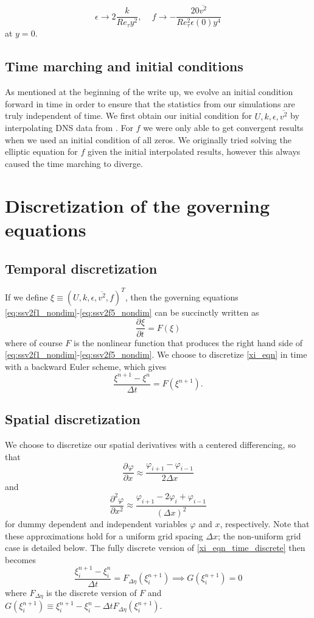 \documentclass[a4paper,11pt]{article}
\newcommand{\pderiv}[3][]{%
  \ensuremath{\frac{\partial^{#1} {#2}}{\partial {#3}^{#1}}}}
\newcommand{\ep}{\epsilon}
\begin{document}
\[
\epsilon \to 2\frac{k}{Re_{\tau}y^2}, \,\,\,\,\,\,\, f \to -\frac{20
\overline{v^2} }{Re_\tau^2 \ep(0) y^4}
\]
at $y = 0$.  

\subsection{Time marching and initial conditions}
As mentioned at the beginning of the write up, we evolve an initial condition
forward in time in order to ensure that the statistics from our simulations are
truly independent of time. We first obtain our initial condition for $U, k, \ep,
\overline{v^2}$ by interpolating DNS data from \cite{Lee}. For $f$ we were only
able to get convergent results when we used an initial condition of all zeros.
We originally tried solving the elliptic equation for $f$ given the initial
interpolated results, however this always caused the time marching to diverge.

\section{Discretization of the governing equations}
\subsection{Temporal discretization}
If we define $\xi \equiv (U, k, \ep, \overline{v^2}, f)^T$, then the governing equations \eqref{eq:ssv2f1_nondim}-\eqref{eq:ssv2f5_nondim} can be succinctly written as 
\begin{equation}\label{xi_eqn}
\pderiv{\xi}{t} = F(\xi)
\end{equation}
where of course $F$ is the nonlinear function that produces the right hand side of \eqref{eq:ssv2f1_nondim}-\eqref{eq:ssv2f5_nondim}. We choose to discretize \eqref{xi_eqn} in time with a backward Euler scheme, which gives
\begin{equation}\label{xi_eqn_time_discrete}
\frac{\xi^{n+1} - \xi^n}{\Delta t} = F(\xi^{n+1}).
\end{equation}

\subsection{Spatial discretization}
We choose to discretize our spatial derivatives with a centered differencing, so that 
\[
\pderiv{\varphi}{x} \approx \frac{\varphi_{i+1}-\varphi_{i-1}}{2\Delta x} 
\]
and 
\[
\frac{\partial^2 \varphi}{\partial x^2} \approx \frac{ \varphi_{i+1} - 2\varphi_i + \varphi_{i-1} }{(\Delta x)^2} 
\]
for dummy dependent and independent variables $\varphi$ and $x$, respectively. Note that these approximations hold for a uniform grid spacing $\Delta x$; the non-uniform grid case is detailed below. The fully discrete version of \eqref{xi_eqn_time_discrete} then becomes 
\begin{equation}\label{xi_eqn_fully_discrete}
\frac{\xi_i^{n+1} - \xi_i^n}{\Delta t} = F_{\Delta \eta}(\xi_i^{n+1}) \implies G(\xi^{n+1}_i) = 0 
\end{equation}
where $F_{\Delta \eta}$ is the discrete version of $F$ and $G(\xi_i^{n+1}) \equiv \xi^{n+1}_i - \xi^n_i - \Delta t F_{\Delta \eta}(\xi_i^{n+1})$. 
\end{document}
